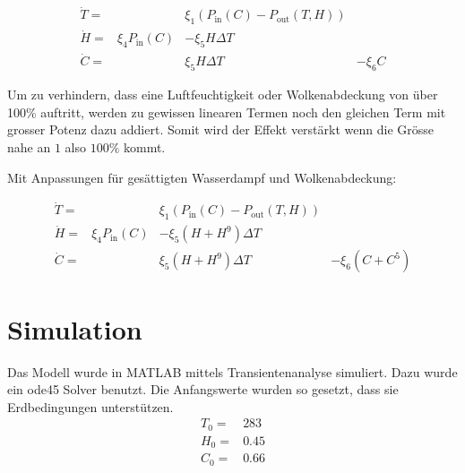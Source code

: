 \begin{refsection}

\begin{equation}
\begin{matrix}
\dot{T} = &  & \xi_1 \left(P_{\text{in}}(C) - P_{\text{out}}(T, H) \right) &\\
\dot{H} = & \xi_4 P_{\text{in}}(C) & - \xi_5 H \Delta T & \\
\dot{C} = &                 &   \xi_5 H \Delta T & - \xi_6 C
\end{matrix}
\end{equation}

Um zu verhindern, dass eine Luftfeuchtigkeit oder Wolkenabdeckung von über 100\% auftritt, werden zu gewissen linearen Termen noch den gleichen Term mit grosser Potenz dazu addiert. Somit wird der Effekt verstärkt wenn die Grösse nahe an $1$ also $100\%$ kommt.  

Mit Anpassungen für gesättigten Wasserdampf und Wolkenabdeckung:

\begin{equation}
\begin{matrix}
\dot{T} = & & \xi_1 \left(P_{\text{in}}(C) - P_{\text{out}}(T, H) \right) &\\
\dot{H} = & \xi_4 P_{\text{in}}(C) & - \xi_5 (H + H^9) \Delta T & \\
\dot{C} = &                       &   \xi_5 (H + H^9) \Delta T & - \xi_6 (C + C^5)
\end{matrix}
\end{equation}


\section{Simulation}

Das Modell wurde in MATLAB mittels Transientenanalyse simuliert. Dazu wurde ein ode45 Solver benutzt. Die Anfangswerte wurden so gesetzt, dass sie Erdbedingungen unterstützen.  
\begin{equation}
\begin{matrix}
T_0 = & 283 \\
H_0 = & 0.45 \\
C_0 = & 0.66
\end{matrix}
\end{equation}


\end{refsection}
